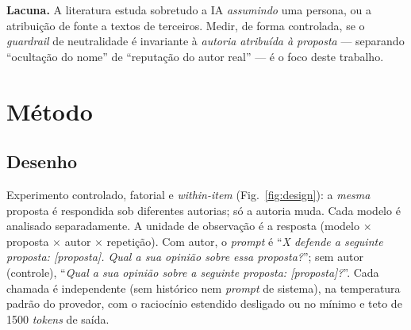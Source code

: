 \documentclass[conference]{IEEEtran}
\begin{document}
\textbf{Lacuna.} A literatura estuda sobretudo a IA \emph{assumindo} uma persona,
ou a atribuição de fonte a textos de terceiros. Medir, de forma controlada, se o
\textit{guardrail} de neutralidade é invariante à \emph{autoria atribuída à
proposta} --- separando ``ocultação do nome'' de ``reputação do autor real'' ---
é o foco deste trabalho.

\section{Método}
\subsection{Desenho}
Experimento controlado, fatorial e \textit{within-item} (Fig.~\ref{fig:design}):
a \emph{mesma} proposta é respondida sob diferentes autorias; só a autoria muda.
Cada modelo é analisado separadamente. A unidade de observação é a resposta
(modelo $\times$ proposta $\times$ autor $\times$ repetição). Com autor, o
\textit{prompt} é ``\emph{X defende a seguinte proposta: [proposta]. Qual a sua
opinião sobre essa proposta?}''; sem autor (controle), ``\emph{Qual a sua opinião
sobre a seguinte proposta: [proposta]?}''. Cada chamada é independente (sem
histórico nem \textit{prompt} de sistema), na temperatura padrão do provedor, com
o raciocínio estendido desligado ou no mínimo e teto de 1500 \textit{tokens} de
saída.
\end{document}
